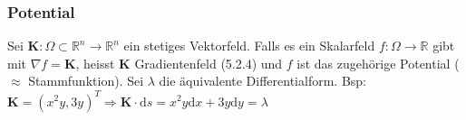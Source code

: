 \documentclass[8pt, a4paper, landscape, fleqn]{scrartcl}
\newenvironment {annotation}[1]
				{\begin{itshape} \begin{small} \textbf{#1} \begin{itemize}}
				{\end{itemize} \end{small} \end{itshape}}
\def\R{\mathbb{R}}
\def\d{\text{d}}
\def\K{\mathbf{K}}
\begin{document}
\begin{multicols*}{3}
				\subsubsection{Potential}
				
				Sei $\K: \Omega \subset \R^n \to \R^n$ ein stetiges Vektorfeld. Falls es ein Skalarfeld $f: \Omega\to\R$ gibt mit $\nabla f = \K$, heisst $\K$ Gradientenfeld (5.2.4) und $f$ ist das zugehörige Potential ($\approx$ Stammfunktion). Sei $\lambda$ die äquivalente Differentialform. Bsp: $\K = (x^2y, 3y)^T \Rightarrow \K \cdot \d s = x^2y \d x + 3y \d y = \lambda$
				

\end{multicols*}
\end{document}
